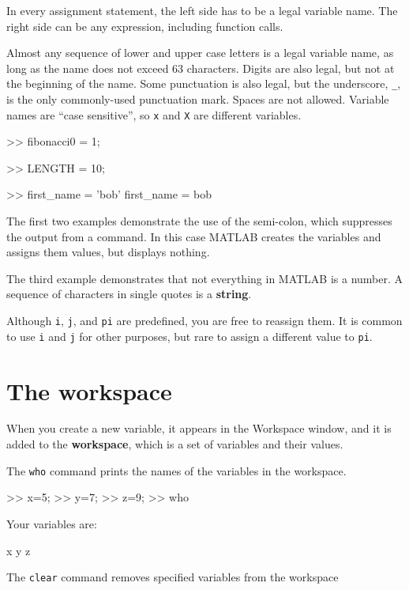 \documentclass[
]{book}
\numberwithin{Answer}{chapter}
\numberwithin{Exercise}{chapter}
\begin{document}
In every assignment statement, the left side has to be a legal variable name.  The right side can be any expression, including function calls.

Almost any sequence of lower and upper case letters is a legal
variable name, as long as the name does not exceed 63 characters.  
Digits are also legal, but not at the beginning of the name.
Some punctuation is also legal, but the underscore,
\verb"_", is the only commonly-used punctuation mark.  
Spaces are not allowed.  Variable names are
``case sensitive'', so {\tt x} and {\tt X} are different variables.

\begin{code}
>> fibonacci0 = 1;

>> LENGTH = 10;

>> first_name = 'bob'
first_name = bob
\end{code}

The first two examples demonstrate the use of the semi-colon, which
suppresses the output from a command.  In this case MATLAB creates the
variables and assigns them values, but displays nothing.

The third example demonstrates that not everything
in MATLAB is a number.  A sequence of characters in single quotes is
a {\bf string}.

Although {\tt i}, {\tt j}, and {\tt pi} are predefined, you are free
to reassign them.  It is common to use {\tt i} and {\tt j} for other
purposes, but rare to assign a different value to
{\tt pi}.


\section{The workspace}

When you create a new variable, it appears in the {\sf Workspace} window, and it is added to the {\bf workspace}, which is a
set of variables and their values.

The {\tt who} command prints the
names of the variables in the workspace.

\begin{code}
>> x=5;
>> y=7;
>> z=9;
>> who

Your variables are:

x  y  z
\end{code}

The {\tt clear} command removes specified variables from the workspace
\end{document}
